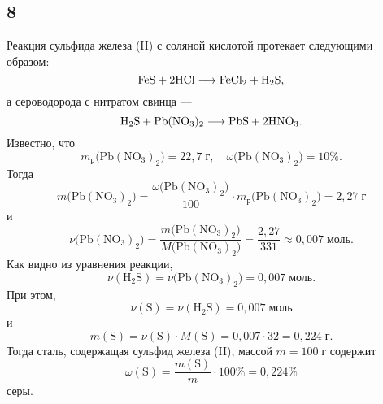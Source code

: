 \subsection{8}

Реакция сульфида железа (II) с соляной кислотой протекает следующими образом:
\[
\rm FeS+2HCl\longrightarrow FeCl_2+H_2S,
\]
а сероводорода с нитратом свинца ---
\[
\rm H_2S+Pb(NO_3)_2\longrightarrow PbS+2HNO_3.
\]
Известно, что
\[
m_\text{р}\bigl(\mathrm{Pb(NO_3)_2}\bigr)=22{,}7\;\text{г},\quad\omega\bigl(\mathrm{Pb(NO_3)_2}\bigr)=10\%.
\]
Тогда
\[
m\bigl(\mathrm{Pb(NO_3)_2}\bigr)=\frac{\omega\bigl(\mathrm{Pb(NO_3)_2}\bigr)}{100}\cdot m_\text{р}\bigl(\mathrm{Pb(NO_3)_2}\bigr)=2{,}27\;\text{г}
\]
и
\[
\nu\bigl(\mathrm{Pb(NO_3)_2}\bigr)=\frac{m\bigl(\mathrm{Pb(NO_3)_2}\bigr)}{M\bigl(\mathrm{Pb(NO_3)_2}\bigr)}
=\frac{2{,}27}{331}\approx0{,}007\;\text{моль}.
\]
Как видно из уравнения реакции,
\[
\nu(\mathrm{H_2S})=\nu\bigl(\mathrm{Pb(NO_3)_2}\bigr)=0{,}007\;\text{моль}.
\]
При этом,
\[
\nu(\mathrm{S})=\nu(\mathrm{H_2S})=0{,}007\;\text{моль}
\]
и
\[
m(\mathrm{S})=\nu(\mathrm{S})\cdot M(\mathrm{S})=0{,}007\cdot32=0{,}224\;\text{г}.
\]
Тогда сталь, содержащая сульфид железа (II), массой $m=100\;\text{г}$ содержит
\[
\omega(\mathrm{S})=\frac{m(\mathrm{S})}{m}\cdot100\%=0{,}224\%
\]
серы.